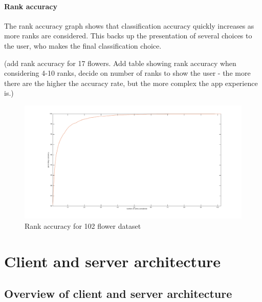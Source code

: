 \documentclass[11pt, a4paper]{report}
\begin{document}
\subsubsection{Rank accuracy}

The rank accuracy graph shows that classification accuracy quickly increases as more ranks are considered. This backs up the presentation of several choices to the user, who makes the final classification choice.

(add rank accuracy for 17 flowers. Add table showing rank accuracy when considering 4-10 ranks, decide on number of ranks to show the user - the more there are the higher the accuracy rate, but the more complex the app experience is.)

\begin{figure}[hbt]
	\centering
  \includegraphics[totalheight=8cm]{img/17.png}
  \caption{Rank accuracy for 102 flower dataset}
  \label{img:17}
\end{figure}



\chapter{Client and server architecture}

\section{Overview of client and server architecture}
\end{document}
